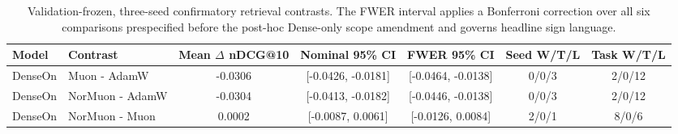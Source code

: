 \begin{table}[t]
\centering
\scriptsize
\setlength{\tabcolsep}{2pt}
\begin{tabular}{llccccc}
\toprule
Model & Contrast & Mean $\Delta$ nDCG@10 & Nominal 95\% CI & FWER 95\% CI & Seed W/T/L & Task W/T/L \\
\midrule
DenseOn & Muon - AdamW & -0.0306 & [-0.0426, -0.0181] & [-0.0464, -0.0138] & 0/0/3 & 2/0/12 \\
DenseOn & NorMuon - AdamW & -0.0304 & [-0.0413, -0.0182] & [-0.0446, -0.0138] & 0/0/3 & 2/0/12 \\
DenseOn & NorMuon - Muon & 0.0002 & [-0.0087, 0.0061] & [-0.0126, 0.0084] & 2/0/1 & 8/0/6 \\
\bottomrule
\end{tabular}
\caption{Validation-frozen, three-seed confirmatory retrieval contrasts. The FWER interval applies a Bonferroni correction over all six comparisons prespecified before the post-hoc Dense-only scope amendment and governs headline sign language.}
\label{tab:confirmation-results}
\end{table}
